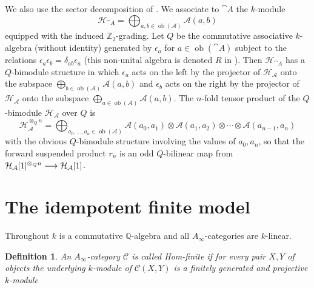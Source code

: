 \documentclass[english,letter paper,12pt,leqno]{article}
\theoremstyle{example}
\newtheorem{definition}[theorem]{Definition}
\numberwithin{equation}{section}
\def\AA{\mathcal{A}}
\def\HH{\HH}
\def\HH{\mathcal{H}}
\def\be{\begin{equation}}
\def\ee{\end{equation}}
\def\nZ{\mathds{Z}}
\begin{document}
We also use the sector decomposition of \cite[\S 2.2]{lazaroiu}. We associate to $\cat{A}$ the $k$-module
\[
\HH_{\cat{A}} = \bigoplus_{a,b \in \operatorname{ob}(\AA)} \AA(a,b)
\]
equipped with the induced $\nZ_2$-grading. Let $Q$ be the commutative associative $k$-algebra (without identity) generated by $\epsilon_a$ for $a \in \operatorname{ob}(\cat{A})$ subject to the relations $\epsilon_a \epsilon_b = \delta_{ab} \epsilon_a$ (this non-unital algebra is denoted $R$ in \cite{lazaroiu}). Then $\HH_{\cat{A}}$ has a $Q$-bimodule structure in which $\epsilon_a$ acts on the left by the projector of $\HH_{\AA}$ onto the subspace $\bigoplus_{b \in \operatorname{ob}(\AA)} \AA(a,b)$ and $\epsilon_b$ acts on the right by the projector of $\HH_{\AA}$ onto the subspace $\bigoplus_{a \in \operatorname{ob}(\AA)} \AA(a,b)$. The $n$-fold tensor product of the $Q$-bimodule $\HH_{\AA}$ over $Q$ is
\be\label{eq:bimodule_tensor_hh}
\HH_{\AA}^{\otimes_Q n} = \bigoplus_{a_0,\ldots,a_n \in \operatorname{ob}(\AA)} \AA(a_0,a_1) \otimes \AA(a_1,a_2) \otimes \cdots \otimes \AA(a_{n-1},a_n)
\ee
with the obvious $Q$-bimodule structure involving the values of $a_0, a_n$, so that the forward suspended product $r_n$ is an odd $Q$-bilinear map from $\HH_{\AA}[1]^{\otimes_Q n} \lto \HH_{\AA}[1]$.




\section{The idempotent finite model}\label{section:the_model}

Throughout $k$ is a commutative $\mathbb{Q}$-algebra and all $A_\infty$-categories are $k$-linear.

\begin{definition} An $A_\infty$-category $\mathcal{C}$ is called \emph{Hom-finite} if for every pair $X,Y$ of objects the underlying $k$-module of $\mathcal{C}(X,Y)$ is a finitely generated and projective $k$-module
\end{definition}
\end{document}
